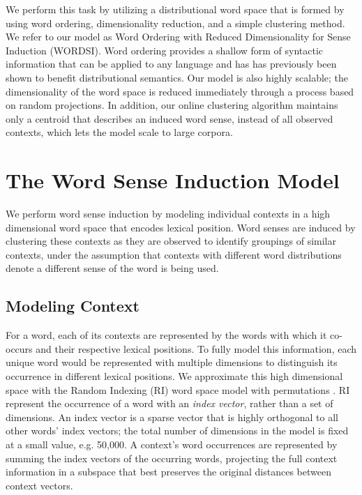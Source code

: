 \documentclass[11pt]{article}
\begin{document}
We perform this task by utilizing a distributional word space that is formed by
using word ordering, dimensionality reduction, and a simple clustering method.
We refer to our model as Word Ordering with Reduced Dimensionality for Sense
Induction (WORDSI).  Word ordering provides a shallow form of syntactic
information that can be applied to any language and has has previously been
shown to benefit distributional semantics\cite{burgess97modeling}.  Our model is
also highly scalable; the dimensionality of the word space is reduced
immediately through a process based on random projections.  In addition, our
online clustering algorithm maintains only a centroid that describes an induced
word sense, instead of all observed contexts, which lets the model scale to
large corpora.

\section{The Word Sense Induction Model}
\label{sec:alg}

We perform word sense induction by modeling individual contexts in a high
dimensional word space that encodes lexical position.  Word senses are induced
by clustering these contexts as they are observed to identify groupings of
similar contexts, under the assumption that contexts with different word
distributions denote a different sense of the word is being used.

\subsection{Modeling Context}
\label{sec:context}

For a word, each of its contexts are represented by the words with which it
co-occurs and their respective lexical positions.  To fully model this
information, each unique word would be represented with multiple dimensions to
distinguish its occurrence in different lexical positions.
We approximate this high dimensional space with the Random Indexing (RI) word
space model \cite{kanerva00random} with permutations
\cite{sahlgren08permutations}.  RI represent the occurrence of a word with an
\emph{index vector}, rather than a set of dimensions.  An index vector is a
sparse vector that is highly orthogonal to all other words' index vectors; the
total number of dimensions in the model is fixed at a small value,
e.g. 50,000. A context's word occurrences are represented by summing the index
vectors of the occurring words, projecting the full context information in a
subspace that best preserves the original distances between context vectors.
\end{document}
